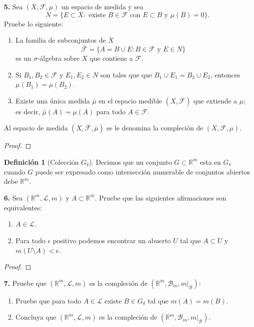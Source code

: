 \documentclass{article}
\newenvironment{statement}[1]{\smallskip\noindent\color[rgb]{1.00,0.00,0.50} {\bf #1.}}{}
\theoremstyle{definition}
\newtheorem{defn}[theorem]{Definici\'on}
\theoremstyle{remark}
\newcommand{\BR}{\mathbb R}
\begin{document}
\begin{statement}{5}
  Sea $(X, \mathcal{F}, \mu)$ un espacio de medida y sea
  \[
    N = \{E \subset X : \text{ existe } B \in \mathcal{F} \text{ con }
    E \subset B \text{ y } \mu(B) = 0\}.
  \]
  Pruebe lo siguiente:
  \begin{enumerate}
    \item La familia de subconjuntos de $X$
    \[
      \bar{\mathcal{F}}= \{A = B \cup E : B \in \mathcal{F} \text{ y } E \in N\}  
    \]
    es un $\sigma$-\'algebra sobre $X$ que contiene a $\mathcal{F}$.
    \item Si $B_1, B_2 \in \mathcal{F}$ y $E_1, E_2 \in N$ son tales que
    que $B_1 \cup E_1 = B_2 \cup E_2$, entonces $\mu(B_1) = \mu(B_2)$.
    \item Existe una \'unica medida $\bar{\mu}$ en el espacio medible
    $(X, \bar{\mathcal{F}})$ que extiende a $\mu$; es decir,
    $\bar{\mu}(A) = \mu(A)$ para todo $A \in \mathcal{F}$.
  \end{enumerate}
  Al espacio de medida $(X, \bar{\mathcal{F}}, \bar{\mu})$ se le
  denomina la compleci\'on de $(X, \mathcal{F}, \mu)$.
\end{statement}

\begin{proof}
\end{proof}

\begin{defn}[Colecci\'on $G_{\delta}$]
  Decimos que un conjunto $G \subset \BR^m$ esta en $G_{\delta}$ cuando $G$
  puede ser expresado como intersecci\'on numerable de conjuntos abiertos debe
  $\BR^m$.
\end{defn}

\begin{statement}{6}
  Sea $(\BR^m, \mathcal{L}, m)$ y $A \subset \BR^m$.
  Pruebe que las siguientes afirmaciones son equivalentes:
  \begin{enumerate}
    \item $A \in \mathcal{L}$.
    \item Para todo $\epsilon$ positivo podemos encontrar un abuerto $U$ tal
    que $A \subset U$ y $m(U \setminus A) < \epsilon$.
  \end{enumerate}
\end{statement}

\begin{proof}
\end{proof}

\begin{statement}{7}
  Pruebe que $(\BR^m, \mathcal{L}, m)$ es la compleción de
  $(\BR^m, \mathcal{B}_m, m |_{\mathcal{B}})$:
  \begin{enumerate}
    \item Pruebe que para todo $A \in \mathcal{L}$ existe $B \in G_{\delta}$
    tal que $m(A) = m(B)$.
    \item Concluya que $(\BR^m, \mathcal{L}, m)$ es la compleci\'on de
    $(\BR^m, \mathcal{B}_m, m |_{\mathcal{B}})$.
  \end{enumerate}
\end{statement}
\end{document}
